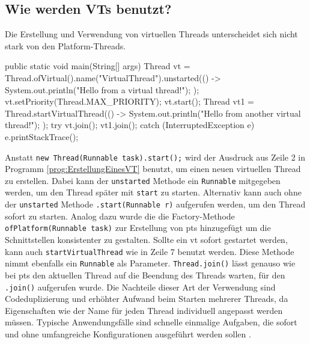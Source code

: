 \subsection{Wie werden VTs benutzt?}
\label{subsec:WieWerdenVTsBenutzt?}

    Die Erstellung und Verwendung von virtuellen Threads unterscheidet sich nicht stark von den Platform-Threads. 
    \begin{program} [H]
        \caption{Erstellung eines \Glspl{vt}}
        \label{prog:ErstellungEinesVT}
    \begin{JavaCode}[language=Java, numbers=left]
public static void main(String[] args) {
    Thread vt = Thread.ofVirtual().name("VirtualThread").unstarted(() -> {
        System.out.println("Hello from a virtual thread!");
    });
    vt.setPriority(Thread.MAX_PRIORITY);
    vt.start();
    Thread vt1 = Thread.startVirtualThread(() -> {
        System.out.println("Hello from another virtual thread!");
    });
    try {
        vt.join(); vt1.join();
    } catch (InterruptedException e) {
        e.printStackTrace();
    }
}\end{JavaCode}
    \end{program}
    Anstatt \texttt{new Thread(Runnable task).start();} wird der Ausdruck aus Zeile 2 in Programm 
    \ref{prog:ErstellungEinesVT} benutzt, um einen neuen virtuellen Thread zu erstellen. Dabei kann der \texttt{unstarted} Methode ein \texttt{Runnable} mitgegeben werden, um den Thread später mit 
    \texttt{start} zu starten. Alternativ kann auch ohne der 
    \texttt{unstarted} Methode \texttt{.start(Runnable r)} aufgerufen werden, um den Thread sofort zu starten. 
    Analog dazu wurde die die Factory-Methode \texttt{ofPlatform(Runnable task)} zur Erstellung von \Glspl{pt} hinzugefügt um die Schnittstellen konsistenter zu gestalten.
    Sollte ein \gls{vt} sofort gestartet werden, kann auch \texttt{startVirtualThread} 
    wie in Zeile 7 benutzt werden. Diese Methode nimmt ebenfalls ein
    \texttt{Runnable} als Parameter. \texttt{Thread.join()} lässt genauso wie bei \Glspl{pt} den aktuellen Thread 
    auf die Beendung des Threads warten, für den \texttt{.join()} aufgerufen wurde. Die Nachteile dieser Art der Verwendung sind Codeduplizierung und erhöhter Aufwand
    beim Starten mehrerer Threads, da Eigenschaften wie der Name für jeden Thread individuell angepasst werden müssen. Typische Anwendungsfälle sind schnelle
    einmalige Aufgaben, die sofort und ohne umfangreiche Konfigurationen ausgeführt werden sollen \cite{oracle21Thread}.

